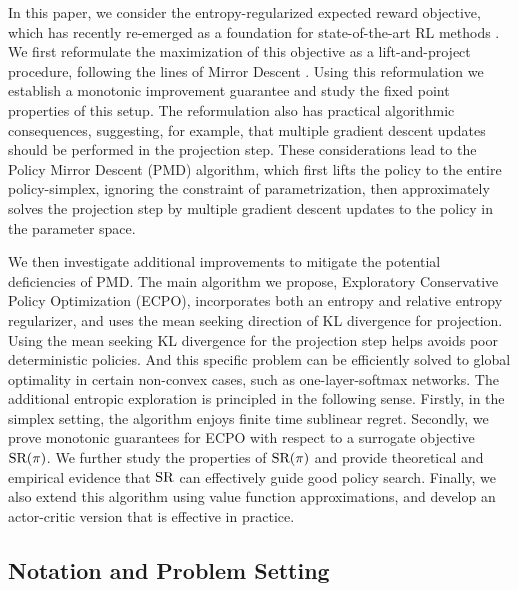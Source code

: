In this paper, %
we consider the entropy-regularized expected reward objective,
which has recently re-emerged as a foundation for state-of-the-art RL methods
\citep{williams1991function,fox2015taming,schulman2017equivalence,nachum2017bridging,haarnoja2017reinforcement}. 
We first reformulate the maximization of 
this objective as a lift-and-project procedure,
following the lines of Mirror Descent
\citep{nemirovskii1983problem,beck2003mirror}.
Using this reformulation we establish a monotonic improvement guarantee and study the fixed point properties of this setup.
The reformulation also has practical algorithmic consequences,
suggesting, for example,
that multiple gradient descent updates should be performed
in the projection step.
These considerations lead to the %
Policy Mirror Descent (PMD) algorithm,
which first lifts the policy to the entire policy-simplex,
ignoring the constraint of parametrization,
then approximately solves the projection step by multiple
gradient descent updates to the policy in the parameter space. 
%
%

We then investigate
additional improvements to mitigate the potential deficiencies of PMD.
The main algorithm we propose, Exploratory Conservative Policy Optimization (ECPO),
incorporates both an entropy and relative entropy regularizer,
and uses the mean seeking direction of KL divergence for projection.
Using the mean seeking KL divergence for the projection step
helps avoids poor deterministic policies. And this specific problem can be efficiently solved to global optimality
in certain non-convex cases,
such as one-layer-softmax networks.
The additional entropic exploration is principled in the following sense.
Firstly, in the simplex setting, the algorithm enjoys finite time sublinear regret.
Secondly, we prove monotonic guarantees for ECPO with respect to a surrogate objective $\text{SR}(\pi)$.
We further study the properties of $\text{SR}(\pi)$ and provide theoretical
and empirical evidence that $\text{SR}$ 
can effectively guide good policy search.
Finally, we also extend this algorithm using value function approximations,
and develop an actor-critic version that is effective in practice.

\subsection{Notation and Problem Setting}
\label{subsec:notations_and_settings}

